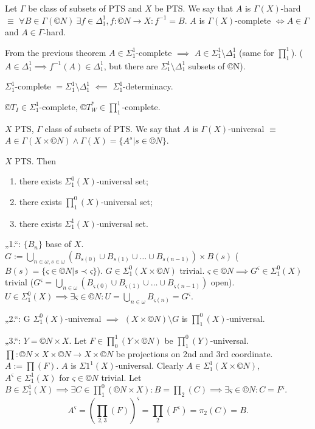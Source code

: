 \documentclass[12pt]{article}					%
\begin{document}
\begin{poznamka}
	Let $Γ$ be class of subsets of PTS and $X$ be PTS. We say that $A$ is $Γ(X)$-hard $≡$ $\forall B \in Γ(©N)\ \exists f \in Δ_1^1, f: ©N \rightarrow X: f^{-1} = B$. $A$ is $Γ(X)$-complete $\Leftrightarrow A \in Γ$ and $A \in Γ$-hard.

	From the previous theorem $A \in Σ_1^1$-complete $\implies$ $A \in Σ_1^1 \setminus Δ_1^1$ (same for $∏_1^1$). ($A \in Δ_1^1 \implies f^{-1}(A) \in Δ_1^1$, but there are $Σ_1^1 \setminus Δ_1^1$ subsets of ©N).
\end{poznamka}

\begin{poznamka}
	$Σ_1^1$-complete $= Σ_1^1 \setminus Δ_1^1$ $\impliedby$ $Σ_1^1$-determinacy.
\end{poznamka}

\begin{poznamka}
	$©T_I \in Σ_1^1$-complete, $©T_W^* \in ∏_1^1$-complete.
\end{poznamka}

\begin{definice}
	$X$ PTS, $Γ$ class of subsets of PTS. We say that $A$ is $Γ(X)$-universal $≡$ $A \in Γ(X \times ©N) \land Γ(X) = \{A^s | s \in ©N\}$.
\end{definice}

\begin{poznamka}
	$X$ PTS. Then
	\begin{enumerate}
		\item there exists $Σ_1^0(X)$-universal set;
		\item there exists $∏_1^0(X)$-universal set;
		\item there exists $Σ_1^1(X)$-universal set.
	\end{enumerate}

	\begin{dukazin}
		„1.“: $\{B_n\}$ base of $X$. $G := \bigcup_{n \in ω, s \in ω} (B_{s(0)} \cup B_{s(1)} \cup … \cup B_{s(n-1)}) \times B(s)$ ($B(s) = \{ς \in ©N | s \prec ς\}$). $G \in Σ_1^0(X \times ©N)$ trivial. $ς \in ©N \implies G^{ς} \in Σ_1^0(X)$ trivial ($G^ς = \bigcup_{n \in ω} (B_{ς(0)} \cup B_{ς(1)} \cup … \cup B_{ς(n-1)})$ open). $U \in Σ_1^0(X) \implies \exists ς \in ©N: U = \bigcup_{n \in ω} B_{ς(n)} = G^ς$.

		„2.“: G $Σ_1^0(X)$-universal $\implies$ $(X \times ©N) \setminus G$ is $∏_1^0(X)$-universal.

		„3.“: $Y = ©N \times X$. Let $F \in ∏_0^1(Y \times ©N)$ be $∏_1^0(Y)$-universal. $∏: ©N \times X \times ©N \rightarrow X \times ©N$ be projections on 2nd and 3rd coordinate. $A := ∏(F)$. $A$ is $Σ1^1(X)$-universal. Clearly $A \in Σ_1^1(X \times ©N)$, $A^ς \in Σ_1^1(X)$ for $ς \in ©N$ trivial. Let $B \in Σ_1^1(X) \implies \exists C \in ∏_1^0(©N \times X): B = ∏_2(C) \implies \exists ς \in ©N: C = F^ς$.
		$$ A^ς = (∏_{2, 3}(F))^ς = ∏_2(F^ς) = π_2(C) = B. $$
	\end{dukazin}
\end{poznamka}
\end{document}
